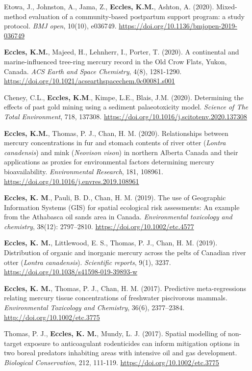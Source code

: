 \documentclass[margin,line]{res}
\begin{document}
\begin{resume}
Etowa, J., Johnston, A., Jama, Z., \textbf{Eccles, K.M.}, Ashton, A. (2020). Mixed-method evaluation of a community-based postpartum support program: a study protocol. \textit{BMJ open}, 10(10), e036749. \url{https://doi.org/10.1136/bmjopen-2019-036749}

\textbf{Eccles, K.M.}, Majeed, H., Lehnherr, I., Porter, T. (2020). A continental and marine-influenced tree-ring mercury record in the Old Crow Flats, Yukon, Canada. \textit{ACS Earth and Space Chemistry}, 4(8), 1281-1290. \url{https://doi.org/10.1021/acsearthspacechem.0c00081.s001}

Cheney, C.L., \textbf{Eccles, K.M}., Kimpe, L.E., Blais, J.M. (2020). Determining the effects of past gold mining using a sediment palaeotoxicity model. \textit{Science of The Total Environment}, 718, 137308. \url{https://doi.org/10.1016/j.scitotenv.2020.137308}

\textbf{Eccles, K.M.}, Thomas, P. J., Chan, H. M. (2020). Relationships between mercury concentrations in fur and stomach contents of river otter (\textit{Lontra canadensis}) and mink (\textit{Neovison vison}) in northern Alberta Canada and their applications as proxies for environmental factors determining mercury bioavailability. \textit{Environmental Research}, 181, 108961. \url{https://doi.org/10.1016/j.envres.2019.108961}

\textbf{Eccles, K. M}., Pauli, B. D., Chan, H. M. (2019). The use of Geographic Information Systems (GIS) for spatial ecological risk assessments: An example from the Athabasca oil sands area in Canada. \textit{Environmental toxicology and chemistry}, 38(12): 2797–2810. \url{https://doi.org/10.1002/etc.4577}

\textbf{Eccles, K. M.}, Littlewood, E. S., Thomas, P. J., Chan, H. M. (2019). Distribution of organic and inorganic mercury across the pelts of Canadian river otter (\textit{Lontra canadensis}). \textit{Scientific reports}, 9(1), 3237. \url{https://doi.org/10.1038/s41598-019-39893-w}

 \textbf{Eccles, K. M.}, Thomas, P. J., Chan, H. M. (2017). Predictive meta-regressions relating mercury tissue concentrations of freshwater piscivorous mammals. \textit{Environmental Toxicology and Chemistry}, 36(6), 2377–2384. \url{http://doi.org/10.1002/etc.3775}

Thomas, P. J., \textbf{Eccles, K. M.}, Mundy, L. J. (2017). Spatial modelling of non-target exposure to anticoagulant rodenticides can inform mitigation options in two boreal predators inhabiting areas with intensive oil and gas development. \textit{Biological Conservation}, 212, 111-119. \url{https://doi.org/10.1002/etc.3775}


\end{resume}
\end{document}
